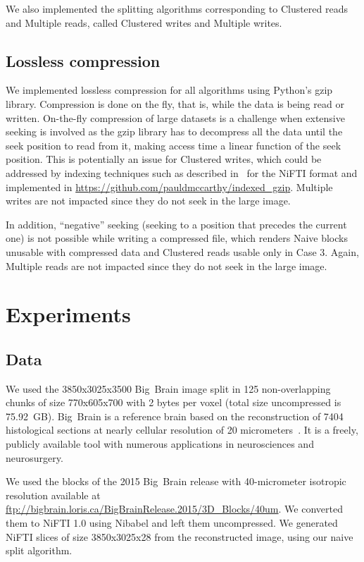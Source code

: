 \documentclass[10pt, conference, compsocconf]{IEEEtran}
\begin{document}
We also implemented the splitting algorithms corresponding to
Clustered reads and Multiple reads, called Clustered writes and
Multiple writes.

\subsection{Lossless compression}

We implemented lossless compression for all algorithms using Python's
gzip library. Compression is done on the fly, that is, while the data
is being read or written. On-the-fly compression of large datasets is
a challenge when extensive seeking is involved as the gzip library has
to decompress all the data until the seek position to read from it,
making access time a linear function of the seek position. This is
potentially an issue for Clustered writes, which could be addressed by
indexing techniques such as described in~\cite{rajna2015speeding} for
the NiFTI format and implemented in
\url{https://github.com/pauldmccarthy/indexed\_gzip}. Multiple writes
are not impacted since they do not seek in the large image.

In addition, ``negative'' seeking (seeking to a position that precedes
the current one) is not possible while writing a compressed file,
which renders Naive blocks unusable with compressed data and Clustered
reads usable only in Case 3.  Again, Multiple reads are not impacted
since they do not seek in the large image.

\section{Experiments}
\label{sec:experiments}

\subsection{Data}
We used the 3850x3025x3500 Big~Brain image split in 125
non-overlapping chunks of size 770x605x700 with 2 bytes per voxel
(total size uncompressed is 75.92~GB). Big~Brain is a reference brain
based on the reconstruction of 7404 histological sections at nearly
cellular resolution of 20 micrometers~\cite{amunts2013bigbrain}. It is
a freely, publicly available tool with numerous applications in
neurosciences and neurosurgery.

We used the blocks of the 2015 Big~Brain release with 40-micrometer
isotropic resolution available at
\url{ftp://bigbrain.loris.ca/BigBrainRelease.2015/3D\_Blocks/40um}. We
converted them to NiFTI 1.0 using Nibabel and left them uncompressed.
We generated NiFTI slices of size 3850x3025x28 from the reconstructed
image, using our naive split algorithm. 
\end{document}
